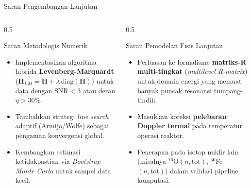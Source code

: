 \documentclass[aspectratio=169, 10pt]{beamer}
\begin{document}
\begin{frame}{Saran Pengembangan Lanjutan}
	\begin{columns}[T]
		\begin{column}{0.5\textwidth}
			\begin{exampleblock}{Saran Metodologis Numerik}
				\small
				\begin{itemize}
					\item Implementasikan algoritma hibrida \textbf{Levenberg-Marquardt} ($\mathbf{H}_{LM} = \mathbf{H} + \lambda\,\mathrm{diag}(\mathbf{H})$) untuk data dengan $\mathrm{SNR} < 3$ atau derau $\eta > 30\%$.
					\item Tambahkan strategi \textit{line search} adaptif (Armijo/Wolfe) sebagai pengaman konvergensi global.
					\item Kembangkan estimasi ketidakpastian via \textit{Bootstrap Monte Carlo} untuk sampel data kecil.
				\end{itemize}
			\end{exampleblock}
		\end{column}

		\begin{column}{0.5\textwidth}
			\begin{block}{Saran Pemodelan Fisis Lanjutan}
				\small
				\begin{itemize}
					\item Perluasan ke formalisme \textbf{matriks-R multi-tingkat} (\textit{multilevel R-matrix}) untuk domain energi yang memuat banyak puncak resonansi tumpang-tindih.
					\item Masukkan koreksi \textbf{pelebaran Doppler termal} pada temperatur operasi reaktor.
					\item Penerapan pada isotop nuklir lain (misalnya $^{16}$O$(n,\text{tot})$, $^{56}$Fe$(n,\text{tot})$) dalam validasi pipeline komputasi.
				\end{itemize}
			\end{block}
		\end{column}
	\end{columns}
\end{frame}
\end{document}
